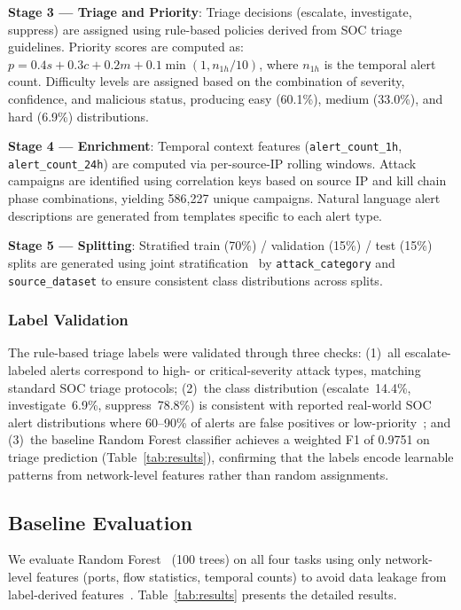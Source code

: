 \documentclass[review]{elsarticle}
\begin{document}
\textbf{Stage 3 --- Triage and Priority}: Triage decisions (escalate, investigate, suppress) are assigned using rule-based policies derived from SOC triage guidelines. Priority scores are computed as: $p = 0.4s + 0.3c + 0.2m + 0.1\min(1, n_{1h}/10)$, where $n_{1h}$ is the temporal alert count. Difficulty levels are assigned based on the combination of severity, confidence, and malicious status, producing easy (60.1\%), medium (33.0\%), and hard (6.9\%) distributions.

\textbf{Stage 4 --- Enrichment}: Temporal context features (\texttt{alert\_count\_1h}, \texttt{alert\_count\_24h}) are computed via per-source-IP rolling windows. Attack campaigns are identified using correlation keys based on source IP and kill chain phase combinations, yielding 586,227 unique campaigns. Natural language alert descriptions are generated from templates specific to each alert type.

\textbf{Stage 5 --- Splitting}: Stratified train (70\%) / validation (15\%) / test (15\%) splits are generated using joint stratification~\cite{sechidis2011stratification} by \texttt{attack\_category} and \texttt{source\_dataset} to ensure consistent class distributions across splits.

\subsubsection*{Label Validation}
The rule-based triage labels were validated through three checks: (1)~all escalate-labeled alerts correspond to high- or critical-severity attack types, matching standard SOC triage protocols; (2)~the class distribution (escalate~14.4\%, investigate~6.9\%, suppress~78.8\%) is consistent with reported real-world SOC alert distributions where 60--90\% of alerts are false positives or low-priority~\cite{alahmadi2022socsurvey,ponemon2023alert}; and (3)~the baseline Random Forest classifier achieves a weighted F1 of 0.9751 on triage prediction (Table~\ref{tab:results}), confirming that the labels encode learnable patterns from network-level features rather than random assignments.


\subsection{Baseline Evaluation}

We evaluate Random Forest~\cite{breiman2001rf} (100 trees) on all four tasks using only network-level features (ports, flow statistics, temporal counts) to avoid data leakage from label-derived features~\cite{kaufman2012leakage}. Table~\ref{tab:results} presents the detailed results.
\end{document}
